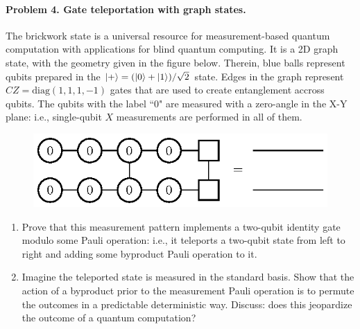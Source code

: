 \documentclass[catalan,spanish,english]{exam}
\begin{document}
\paragraph{Problem 4. Gate teleportation with graph states.}
The brickwork state is a universal resource for measurement-based quantum computation with applications for blind quantum computing. It is a 2D graph state, with the geometry given in the figure below. Therein, blue balls represent qubits prepared in the $\left|+\right\rangle=(\left|0\right\rangle+\left|1\right\rangle)/\sqrt{2}$ state. Edges in the graph represent $CZ=\mathrm{diag}(1,1,1,-1)$ gates that are used to create entanglement accross qubits. The qubits with the label ``0" are measured with a zero-angle in the X-Y plane: i.e., single-qubit $X$ measurements are performed in all of them.
 \begin{figure}[ht] 
 \centering
   \includegraphics{f4}
 \label{Fig:identity}
 \end{figure}
\begin{enumerate}
    \item Prove that this measurement pattern implements a two-qubit identity gate modulo some Pauli operation: i.e., it teleports a two-qubit state from left to right and adding some byproduct Pauli operation to it.
    \item Imagine the teleported state is measured in the standard basis. Show that the action of a byproduct  prior to the measurement Pauli operation is to permute the outcomes in a predictable deterministic way. Discuss: does this jeopardize the outcome of a quantum computation?
\end{enumerate}
\end{document}
